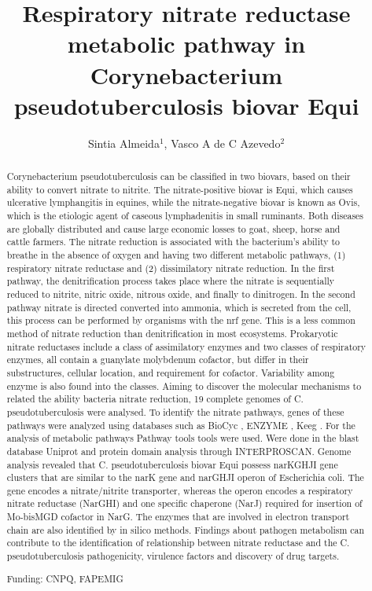 \documentclass[twoside]{article}
\title{\vspace{-15mm}\fontsize{24pt}{10pt}\selectfont\textbf{Respiratory nitrate reductase metabolic pathway in Corynebacterium pseudotuberculosis biovar Equi}} %
\author{Sintia Almeida$^1$, Vasco A de C Azevedo$^2$}
\affil{1 USP\\ 2 UFMG\\ }
\date{}
\begin{document}
\maketitle %

\thispagestyle{fancy} %


\begin{abstract}
Corynebacterium pseudotuberculosis can be classified in two biovars, based on their ability to convert nitrate to nitrite. The nitrate-positive biovar is Equi, which causes ulcerative lymphangitis in equines, while the nitrate-negative biovar is known as Ovis, which is the etiologic agent of caseous lymphadenitis in small ruminants. Both diseases are globally distributed and cause large economic losses to goat, sheep, horse and cattle farmers. 
The nitrate reduction is associated with the bacterium's ability to breathe in the absence of oxygen and having two different metabolic pathways, (1) respiratory nitrate reductase and (2) dissimilatory nitrate reduction. In the first pathway, the denitrification process takes place where the nitrate is sequentially reduced to nitrite, nitric oxide, nitrous oxide, and finally to dinitrogen. In the second pathway nitrate is directed converted into ammonia, which is secreted from the cell, this process can be performed by organisms with the nrf gene. This is a less common method of nitrate reduction than denitrification in most ecosystems. Prokaryotic nitrate reductases include a class of assimilatory enzymes and two classes of respiratory enzymes, all contain a guanylate molybdenum cofactor, but differ in their substructures, cellular location, and requirement for cofactor. Variability among enzyme is also found into the classes. 
Aiming to discover the molecular mechanisms to related the ability bacteria nitrate reduction, 19 complete genomes of C. pseudotuberculosis were analysed. To identify the nitrate pathways, genes of these pathways were analyzed using databases such as BioCyc , ENZYME , Keeg . For the analysis of metabolic pathways Pathway tools tools were used. Were done in the blast database Uniprot and protein domain analysis through  INTERPROSCAN. 
Genome analysis revealed that C. pseudotuberculosis biovar Equi possess narKGHJI gene clusters that are similar to the narK gene and narGHJI operon of Escherichia coli. The gene encodes a nitrate/nitrite transporter, whereas the operon encodes a respiratory nitrate reductase (NarGHI) and one specific chaperone (NarJ) required for insertion of Mo-bisMGD cofactor in NarG.
The enzymes that are involved in electron transport chain are also identified by in silico methods. Findings about pathogen metabolism can contribute to the identification of relationship between nitrate reductase and the C. pseudotuberculosis pathogenicity, virulence factors and discovery of drug targets.

Funding: CNPQ, FAPEMIG
\end{abstract}
\end{document}
